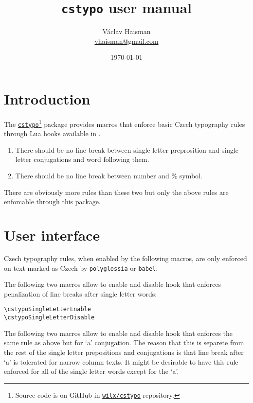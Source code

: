 \documentclass[paper=B5,DIV=calc,parskip=half]{scrartcl}
\author{Václav Haisman\texorpdfstring{%
    \\{\small\href{mailto:vhaisman+cstypo@gmail.com?subject=[cstypo]}{vhaisman@gmail.com}}}{}}
\date{\today}
\title{\texttt{cstypo} user manual}
\begin{document}
\begin{titlepage}
  \maketitle  
\end{titlepage}

\tableofcontents

\section{Introduction}
The \href{https://www.ctan.org/pkg/cstypo}{\texttt{cstypo}}\footnote{Source
  code is on GitHub in
  \href{https://github.com/wilx/cstypo}{\texttt{wilx/cstypo}} repository.}
package provides macros that enforce basic Czech typography rules through Lua
hooks available in \LuaTeX{}.

\begin{enumerate}%
\item\label{itm:singleletter} There should be no line break between single
  letter preprosition and single letter conjugations and word following them.
\item\label{itm:percents} There should be no line break between number and \%
  symbol.
\end{enumerate}

There are obviously more rules than these two but only the above rules are
enforcable through this package.

\section{User interface}

Czech typography rules, when enabled by the following macros, are only
enforced on text marked as Czech by \texttt{polyglossia} or \texttt{babel}.

The following two macros allow to enable and disable hook that enforces
penalization of line breaks after single letter words:

\begin{lstlisting}[style=myLatexStyle]
\cstypoSingleLetterEnable
\cstypoSingleLetterDisable
\end{lstlisting}

The following two macros allow to enable and disable hook that enforces the
same rule as above but for ‘a’ conjugation. The reason that this is separete
from the rest of the single letter prepositions and conjugations is that line
break after ‘a’ is tolerated for narrow column texts. It might be desirable
to have this rule enforced for all of the single letter words except for the
‘a’.
\end{document}
